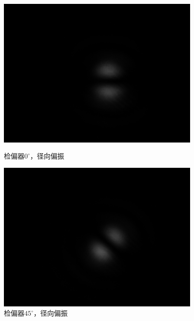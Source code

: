 \documentclass[a4paper,UTF8]{ctexart}
\begin{document}
\begin{figure}[H]
    \centering
    \begin{minipage}[b]{0.45\textwidth}
        \centering
        \includegraphics[width=0.9\textwidth]{./fig/1_1.png}
        \caption{检偏器$0^{\circ}$，径向偏振}
    \end{minipage}
    \begin{minipage}[b]{0.45\textwidth}
        \centering
        \includegraphics[width=0.9\textwidth]{./fig/1_4.png}
        \caption{检偏器$45^{\circ}$，径向偏振}
    \end{minipage}
\end{figure}
\end{document}
